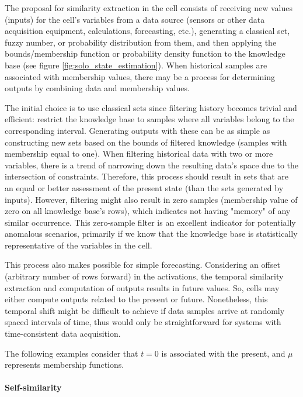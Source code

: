 The proposal for similarity extraction in the cell consists of receiving new values (inputs) for the cell's variables from a data source (sensors or other data acquisition equipment, calculations, forecasting, etc.), generating a classical set, fuzzy number, or probability distribution from them, and then applying the bounds/membership function or probability density function to the knowledge base (see figure \ref{fig:solo_state_estimation}). When historical samples are associated with membership values, there may be a process for determining outputs by combining data and membership values.

The initial choice is to use classical sets since filtering history becomes trivial and efficient: restrict the knowledge base to samples where all variables belong to the corresponding interval. Generating outputs with these can be as simple as constructing new sets based on the bounds of filtered knowledge (samples with membership equal to one). When filtering historical data with two or more variables, there is a trend of narrowing down the resulting data's space due to the intersection of constraints. Therefore, this process should result in sets that are an equal or better assessment of the present state (than the sets generated by inputs). However, filtering might also result in zero samples (membership value of zero on all knowledge base's rows), which indicates not having "memory" of any similar occurrence. This zero-sample filter is an excellent indicator for potentially anomalous scenarios, primarily if we know that the knowledge base is statistically representative of the variables in the cell.

This process also makes possible for simple forecasting. Considering an offset (arbitrary number of rows forward) in the activations, the temporal similarity extraction and computation of outputs results in future values. So, cells may either compute outputs related to the present or future. Nonetheless, this temporal shift might be difficult to achieve if data samples arrive at randomly spaced intervals of time, thus would only be straightforward for systems with time-consistent data acquisition.

The following examples consider that $t=0$ is associated with the present, and $\mu$ represents membership functions.

\paragraph{Self-similarity}


